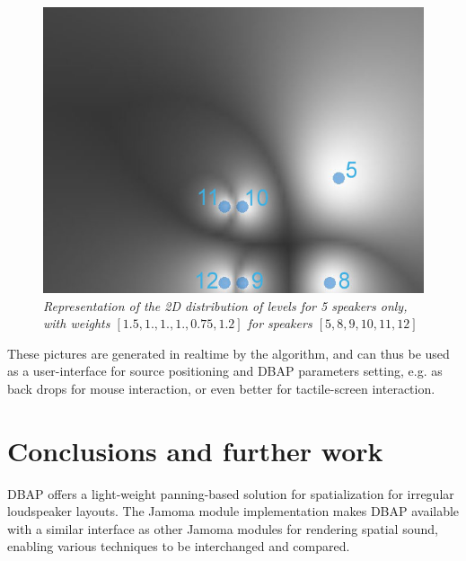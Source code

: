 \documentclass[twoside,10pt]{article}
\begin{document}
\begin{figure}[ht]
\centerline{\includegraphics[scale=0.5]{spk_groups+nbrs}}
\caption{{\it Representation of the 2D distribution of levels for 5 speakers only, with weights $[1.5,1.,1.,1.,0.75,1.2]$ for speakers $[5,8,9,10,11,12]$}}  
\label{fig:5spk_weights}
\end{figure}


These pictures are generated in realtime by the algorithm, and can thus be used as a user-interface for source positioning and DBAP parameters setting, e.g. as back drops for mouse interaction, or even better for tactile-screen interaction.



\section{Conclusions and further work}

DBAP offers a light-weight panning-based solution for spatialization for irregular loudspeaker layouts. The Jamoma module implementation makes DBAP available with a similar interface as other Jamoma modules for rendering spatial sound, enabling various techniques to be interchanged and compared. %
\end{document}
